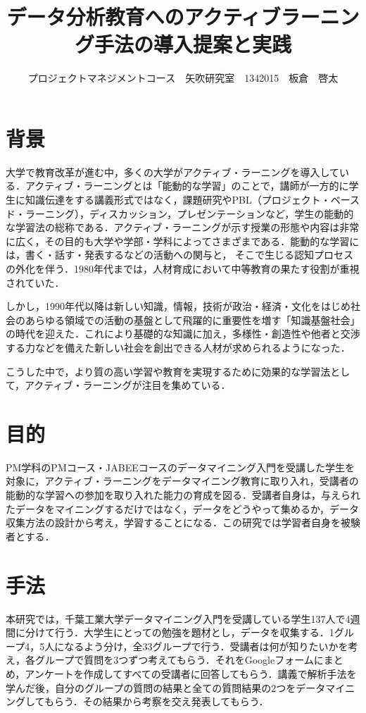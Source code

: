 \documentclass[uplatex,twocolumn,dvipdfmx]{jsarticle}
\title{\vspace{-5mm}\fontsize{14pt}{0pt}\selectfont  データ分析教育へのアクティブラーニング手法の導入提案と実践}
\author{\normalsize プロジェクトマネジメントコース　矢吹研究室　1342015　板倉　啓太}
\date{}
\begin{document}
\fontsize{10.5pt}{\baselineskip}\selectfont
\maketitle




\section{背景}

大学で教育改革が進む中，多くの大学がアクティブ・ラーニングを導入している．アクティブ・ラーニングとは「能動的な学習」のことで，講師が一方的に学生に知識伝達をする講義形式ではなく，課題研究やPBL（プロジェクト・ベースド・ラーニング），ディスカッション，プレゼンテーションなど，学生の能動的な学習法の総称である．アクティブ・ラーニングが示す授業の形態や内容は非常に広く，その目的も大学や学部・学科によってさまざまである．能動的な学習には，書く・話す・発表するなどの活動への関与と， そこで生じる認知プロセスの外化を伴う．1980年代までは，人材育成において中等教育の果たす役割が重視されていた．\cite{a}

しかし，1990年代以降は新しい知識，情報，技術が政治・経済・文化をはじめ社会のあらゆる領域での活動の基盤として飛躍的に重要性を増す「知識基盤社会」の時代を迎えた．これにより基礎的な知識に加え，多様性・創造性や他者と交渉する力などを備えた新しい社会を創出できる人材が求められるようになった．

こうした中で，より質の高い学習や教育を実現するために効果的な学習法として，アクティブ・ラーニングが注目を集めている．




\section{目的}

PM学科のPMコース・JABEEコースのデータマイニング入門を受講した学生を対象に，アクティブ・ラーニングをデータマイニング教育に取り入れ，受講者の能動的な学習への参加を取り入れた能力の育成を図る．受講者自身は，与えられたデータをマイニングするだけではなく，データをどうやって集めるか，データ収集方法の設計から考え，学習することになる\cite{b}．この研究では学習者自身を被験者とする．



\section{手法}

本研究では，千葉工業大学データマイニング入門を受講している学生137人で4週間に分けて行う．大学生にとっての勉強を題材とし，データを収集する．1グループ4，5人になるよう分け，全33グループで行う．受講者は何が知りたいかを考え，各グループで質問を3つずつ考えてもらう．それをGoogleフォームにまとめ，アンケートを作成してすべての受講者に回答してもらう．講義で解析手法を学んだ後，自分のグループの質問の結果と全ての質問結果の2つをデータマイニングしてもらう．その結果から考察を交え発表してもらう．
\end{document}
